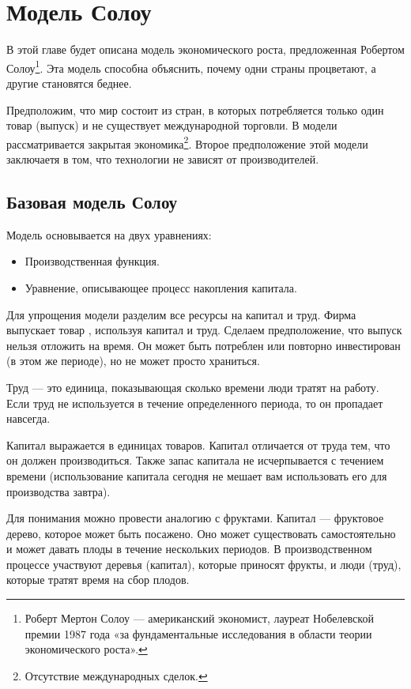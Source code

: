 \chapter{Модель Солоу}
\label{cha:solow_models}

В этой главе будет описана модель экономического роста, предложенная Робертом Солоу\footnote{Роберт Мертон Солоу --- американский экономист, лауреат Нобелевской премии 1987 года «за фундаментальные исследования в области теории экономического роста»\cite{wiki:Robert_Solow}.}.
Эта модель способна объяснить, почему одни страны процветают, а другие становятся беднее.

Предположим, что мир состоит из стран, в которых потребляется только один товар (выпуск) и не существует международной торговли.
В модели рассматривается закрытая экономика\footnote{Отсутствие международных сделок.}.
Второе предположение этой модели заключаетя в том, что технологии не зависят от производителей.

\section{Базовая модель Солоу}

Модель основывается на двух уравнениях:
\begin{itemize}
	\item Производственная функция.
	\item Уравнение, описывающее процесс накопления капитала.
\end{itemize}

Для упрощения модели разделим все ресурсы на капитал и труд.
Фирма выпускает товар , используя капитал и труд.
Сделаем предположение, что выпуск нельзя отложить на время.
Он может быть потреблен или повторно инвестирован (в этом же периоде), но не может просто храниться.

Труд --- это единица, показывающая сколько времени люди тратят на работу.
Если труд не используется в течение определенного периода, то он пропадает навсегда.

Капитал выражается в единицах товаров.
Капитал отличается от труда тем, что он должен производиться.
Также запас капитала не исчерпывается с течением времени (использование капитала сегодня не мешает вам использовать его для производства завтра).

Для понимания можно провести аналогию с фруктами.
Капитал --- фруктовое дерево, которое может быть посажено.
Оно может существовать самостоятельно и может давать плоды в течение нескольких периодов.
В производственном процессе участвуют деревья (капитал), которые приносят фрукты, и люди (труд), которые тратят время на сбор плодов.


